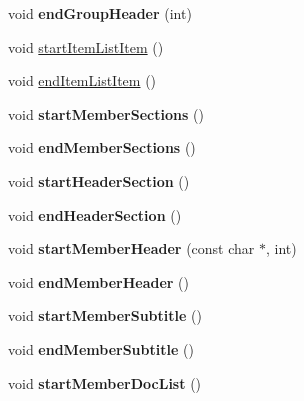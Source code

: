 \begin{DoxyCompactItemize}
\item 
\mbox{\label{class_html_generator_abfe85b944b5ebe2ca5455d44ea755c8d}} 
void {\bfseries end\+Group\+Header} (int)
\item 
void \mbox{\hyperlink{class_html_generator_aaa5091e04c77ea310e0c5dee4cc04e94}{start\+Item\+List\+Item}} ()
\item 
void \mbox{\hyperlink{class_html_generator_a91f6100cb025e52c1cef35b8749761b2}{end\+Item\+List\+Item}} ()
\item 
\mbox{\label{class_html_generator_ab81f4238abee6baf6234c1a94a03df18}} 
void {\bfseries start\+Member\+Sections} ()
\item 
\mbox{\label{class_html_generator_a60d8489e48efdf2a04d56ff3fcadbe1c}} 
void {\bfseries end\+Member\+Sections} ()
\item 
\mbox{\label{class_html_generator_a966c1d75a00ae4494356fd94b2d2c1bf}} 
void {\bfseries start\+Header\+Section} ()
\item 
\mbox{\label{class_html_generator_a164f820134d45aaac56a60fe05b62963}} 
void {\bfseries end\+Header\+Section} ()
\item 
\mbox{\label{class_html_generator_ade3e0b0ba0fa975c5e1db1c1f4ee2110}} 
void {\bfseries start\+Member\+Header} (const char $\ast$, int)
\item 
\mbox{\label{class_html_generator_a9188640d2baf3775008ebcde5d94873d}} 
void {\bfseries end\+Member\+Header} ()
\item 
\mbox{\label{class_html_generator_a71af5b3b4b0ffb7f7f664a7d8205547d}} 
void {\bfseries start\+Member\+Subtitle} ()
\item 
\mbox{\label{class_html_generator_a3f449b4e7f55848442238528a7c19931}} 
void {\bfseries end\+Member\+Subtitle} ()
\item 
\mbox{\label{class_html_generator_a1d6acde43c3f5608a64cc8f3ec90738d}} 
void {\bfseries start\+Member\+Doc\+List} ()

\end{DoxyCompactItemize}
